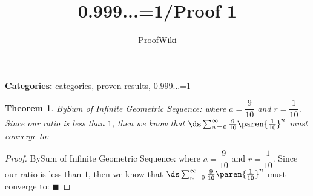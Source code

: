 \documentclass{article}
\title{0.999...=1/Proof 1}
\author{ProofWiki}
\date{}
\newtheorem{theorem}{Theorem}
\begin{document}
\maketitle

\noindent\textbf{Categories:} categories, proven results, 0.999...=1

\begin{theorem}
BySum of Infinite Geometric Sequence: where $a = \dfrac 9 {10}$ and $r = \dfrac 1 {10}$. Since our ratio is less than $1$, then we know that $\ds \sum_{n \mathop = 0}^\infty \frac 9 {10} \paren {\frac 1 {10} }^n$ must converge to:
\end{theorem}

\begin{proof}
BySum of Infinite Geometric Sequence: where $a = \dfrac 9 {10}$ and $r = \dfrac 1 {10}$. Since our ratio is less than $1$, then we know that $\ds \sum_{n \mathop = 0}^\infty \frac 9 {10} \paren {\frac 1 {10} }^n$ must converge to: $\blacksquare$
\end{proof}
\end{document}
